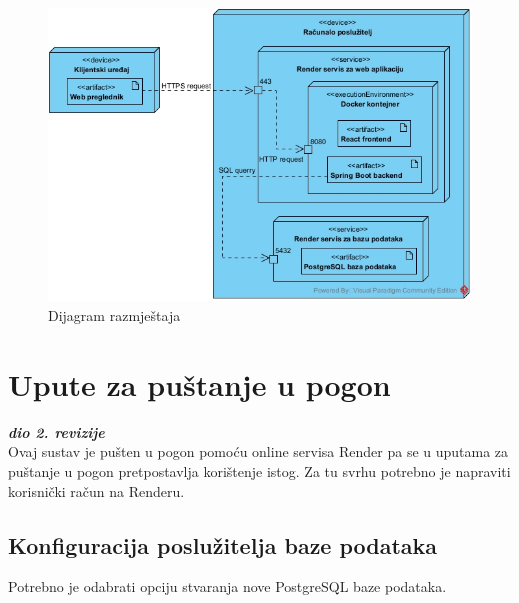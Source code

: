			\begin{figure}[H]
				\includegraphics[width=\textwidth]{slike/dijagramRazmjestaja.jpg} %
				\caption{Dijagram razmještaja}
				\label{fig:dijagramRazmjestaja} %
			\end{figure}
			
			\eject 
		
		\section{Upute za puštanje u pogon}
		
			\textbf{\textit{dio 2. revizije}}\\
			
			Ovaj sustav je pušten u pogon pomoću online servisa Render pa se u uputama za puštanje u pogon pretpostavlja korištenje istog. Za tu svrhu potrebno je napraviti korisnički račun na Renderu. 
			
			\subsection{Konfiguracija poslužitelja baze podataka}
			
			Potrebno je odabrati opciju stvaranja nove PostgreSQL baze podataka.
			
